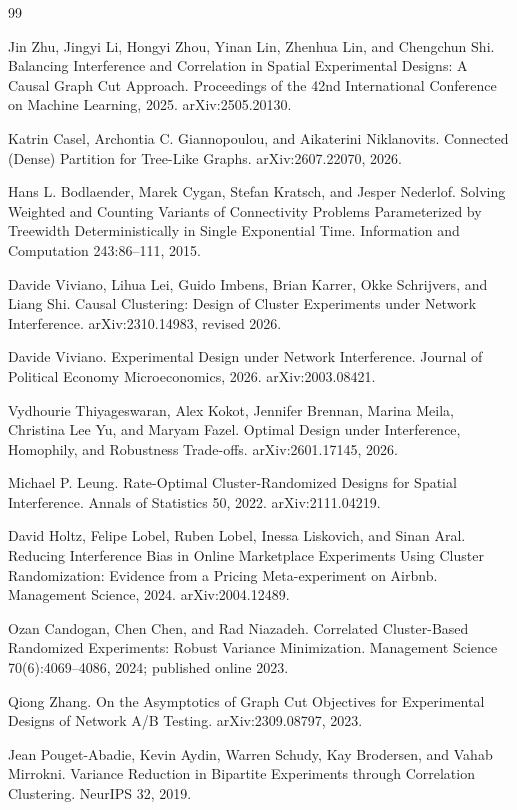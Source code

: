 \documentclass{article}
\begin{document}
\begin{thebibliography}{99}

   Jin Zhu, Jingyi Li, Hongyi Zhou, Yinan Lin, Zhenhua Lin, and Chengchun Shi. Balancing Interference and Correlation in Spatial Experimental Designs: A Causal Graph Cut Approach. Proceedings of the 42nd International Conference on Machine Learning, 2025. arXiv:2505.20130.

   Katrin Casel, Archontia C. Giannopoulou, and Aikaterini Niklanovits. Connected (Dense) Partition for Tree-Like Graphs. arXiv:2607.22070, 2026.

   Hans L. Bodlaender, Marek Cygan, Stefan Kratsch, and Jesper Nederlof. Solving Weighted and Counting Variants of Connectivity Problems Parameterized by Treewidth Deterministically in Single Exponential Time. Information and Computation 243:86--111, 2015.

   Davide Viviano, Lihua Lei, Guido Imbens, Brian Karrer, Okke Schrijvers, and Liang Shi. Causal Clustering: Design of Cluster Experiments under Network Interference. arXiv:2310.14983, revised 2026.

   Davide Viviano. Experimental Design under Network Interference. Journal of Political Economy Microeconomics, 2026. arXiv:2003.08421.

   Vydhourie Thiyageswaran, Alex Kokot, Jennifer Brennan, Marina Meila, Christina Lee Yu, and Maryam Fazel. Optimal Design under Interference, Homophily, and Robustness Trade-offs. arXiv:2601.17145, 2026.

   Michael P. Leung. Rate-Optimal Cluster-Randomized Designs for Spatial Interference. Annals of Statistics 50, 2022. arXiv:2111.04219.

   David Holtz, Felipe Lobel, Ruben Lobel, Inessa Liskovich, and Sinan Aral. Reducing Interference Bias in Online Marketplace Experiments Using Cluster Randomization: Evidence from a Pricing Meta-experiment on Airbnb. Management Science, 2024. arXiv:2004.12489.

   Ozan Candogan, Chen Chen, and Rad Niazadeh. Correlated Cluster-Based Randomized Experiments: Robust Variance Minimization. Management Science 70(6):4069--4086, 2024; published online 2023.

   Qiong Zhang. On the Asymptotics of Graph Cut Objectives for Experimental Designs of Network A/B Testing. arXiv:2309.08797, 2023.

   Jean Pouget-Abadie, Kevin Aydin, Warren Schudy, Kay Brodersen, and Vahab Mirrokni. Variance Reduction in Bipartite Experiments through Correlation Clustering. NeurIPS 32, 2019.

\end{thebibliography}
\end{document}

